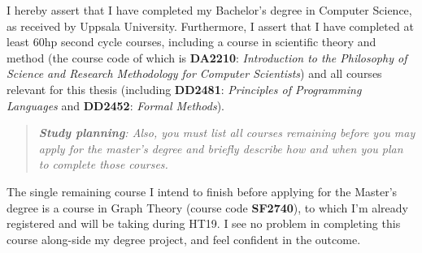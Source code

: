 \documentclass[12pt, a4paper]{article}
\begin{document}
I hereby assert that I have completed my Bachelor's degree in Computer Science, as received by Uppsala University. Furthermore, I assert that I have completed at least 60hp second cycle courses, including a course in scientific theory and method (the course code of which is \textbf{DA2210}: \textit{Introduction to the Philosophy of Science and Research Methodology for Computer Scientists}) and all courses relevant for this thesis (including \textbf{DD2481}: \textit{Principles of Programming Languages} and \textbf{DD2452}: \textit{Formal Methods}).

\begin{quote}
	\textit{\textbf{Study planning}: Also, you must list all courses remaining before you may apply for the master's degree and briefly describe how and when you plan to complete those courses.}
\end{quote}

The single remaining course I intend to finish before applying for the Master's degree is a course in Graph Theory (course code \textbf{SF2740}), to which I'm already registered and will be taking during HT19. I see no problem in completing this course along-side my degree project, and feel confident in the outcome.







%
\end{document}
